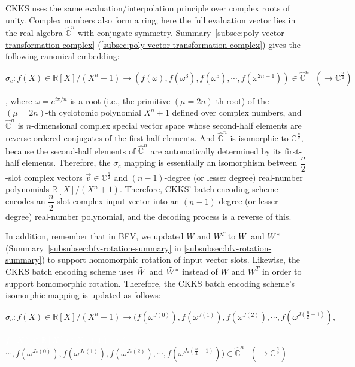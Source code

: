 CKKS uses the same evaluation/interpolation principle over complex roots of unity. Complex numbers also form a ring; here the full evaluation vector lies in the real algebra $\mathbb{\hat C}^n$ with conjugate symmetry. Summary~\ref*{subsec:poly-vector-transformation-complex} (\autoref{subsec:poly-vector-transformation-complex}) gives the following canonical embedding:

$\sigma_c: f(X) \in \mathbb{R}[X]/(X^n + 1) \longrightarrow (f(\omega),f(\omega^3),f(\omega^5), \cdots, f(\omega^{2n-1})) \in \mathbb{\hat{C}}^{n} \text{ } (\longrightarrow \mathbb{C}^{\frac{n}{2}})$


, where $\omega = e^{i\pi/n}$ is a root (i.e., the primitive $(\mu=2n)$-th root) of the $(\mu=2n)$-th cyclotomic polynomial $X^n + 1$ defined over complex numbers, and $\mathbb{\hat{C}}^{n}$ is $n$-dimensional complex special vector space whose second-half elements are reverse-ordered conjugates of the first-half elements. And $\mathbb{\hat{C}}^{n}$ is isomorphic to $\mathbb{{C}}^{\frac{n}{2}}$, because the second-half elements of $\mathbb{\hat{C}}^{n}$ are automatically determined by its first-half elements. Therefore, the $\sigma_c$ mapping is essentially an isomorphism between $\dfrac{n}{2}$-slot complex vectors $\vec{v} \in \mathbb{C}^{\frac{n}{2}}$ and $(n-1)$-degree (or lesser degree) real-number polynomials $\mathbb{R}[X] / (X^n + 1)$. Therefore, CKKS' batch encoding scheme encodes an $\dfrac{n}{2}$-slot complex input vector into an $(n-1)$-degree (or lesser degree) real-number polynomial, and the decoding process is a reverse of this.

In addition, remember that in BFV, we updated $W$ and $W^T$ to $\tilde W$ and $\tilde W^*$ (Summary~\ref*{subsubsec:bfv-rotation-summary} in \autoref{subsubsec:bfv-rotation-summary}) to support homomorphic rotation of input vector slots. Likewise, the CKKS batch encoding scheme uses $\tilde W$ and $\tilde W^*$ instead of $W$ and $W^T$ in order to support homomorphic rotation. Therefore, the CKKS batch encoding scheme's isomorphic mapping is updated as follows:


$\sigma_c: f(X) \in \mathbb{R}[X]/(X^n + 1) \longrightarrow \bm ( f(\omega^{J(0)}),f(\omega^{J(1)}),f(\omega^{J(2)}), \cdots, f(\omega^{J(\frac{n}{2} - 1)}), $

\textcolor{white}{$ f(X) \in \mathbb{R}[X]/(X^n + 1) \longrightarrow \bm ( $} $\cdots, f(\omega^{J_*(0)}),f(\omega^{J_*(1)}),f(\omega^{J_*(2)}), \cdots, f(\omega^{J_*(\frac{n}{2} - 1)}) \bm) \in \mathbb{\hat{C}}^{n} \text{ } (\longrightarrow \mathbb{C}^{\frac{n}{2}})$

